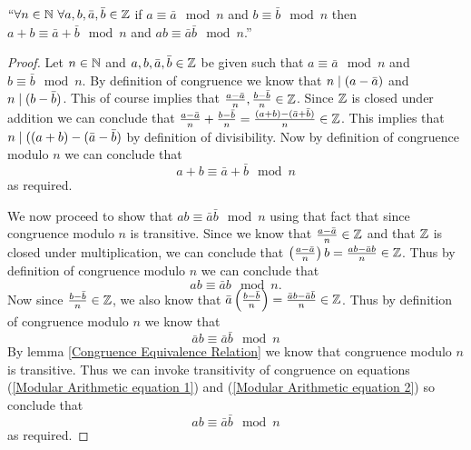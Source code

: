         \begin{lemma}
            $``\forall n \in \mathbb{N} \ \forall a, b, \bar{a}, \bar{b} \in \mathbb{Z}$
            if $a \equiv \bar{a} \mod n$ and $b \equiv \bar{b} \mod n$ then
            $a + b \equiv \bar{a} + \bar{b} \mod n$ and $ab \equiv \bar{a}\bar{b} \mod n$.''
        \end{lemma}
        \begin{proof}
            Let $n \in \mathbb{N}$ and $a, b, \bar{a}, \bar{b} \in \mathbb{Z}$ be given such
            that $a \equiv \bar{a} \mod n$ and $b \equiv \bar{b} \mod n$. By definition 
            of congruence we know that $n \mid (a - \bar{a})$ and $n \mid (b - \bar{b})$.
            This of course implies that $\frac{a - \bar{a}}{n}, \frac{b - \bar{b}}{n} \in \mathbb{Z}$.
            Since $\mathbb{Z}$ is closed under addition we can conclude that
            $\frac{a - \bar{a}}{n} + \frac{b - \bar{b}}{n} = \frac{(a + b) - (\bar{a} + \bar{b})}{n} \in \mathbb{Z}$.
            This implies that $n \mid ((a + b) - (\bar{a} - \bar{b})$ by definition of divisibility.
            Now by definition of congruence modulo $n$ we can conclude that 
            \[
                a + b \equiv \bar{a} + \bar{b} \mod n
            \]
            as required.

            We now proceed to show that $ab \equiv \bar{a}\bar{b} \mod n$ using that fact
            that since congruence modulo $n$ is transitive. Since we know that $\frac{a - \bar{a}}{n} \in \mathbb{Z}$
            and that $\mathbb{Z}$ is closed under multiplication, we can conclude that
            $\left(\frac{a - \bar{a}}{n}\right)b = \frac{ab - \bar{a}b}{n} \in \mathbb{Z}$.
            Thus by definition of congruence modulo $n$ we can conclude that
            \begin{equation}
                ab \equiv \bar{a}b \mod n.
                \label{Modular Arithmetic equation 1}
            \end{equation}
            Now since $\frac{b - \bar{b}}{n} \in \mathbb{Z}$, we also know that
            $\bar{a}\left(\frac{b - \bar{b}}{n}\right) = \frac{\bar{a}b - \bar{a}\bar{b}}{n} \in \mathbb{Z}$.
            Thus by definition of congruence modulo $n$ we know that
            \begin{equation}
                \bar{a}b \equiv \bar{a}\bar{b} \mod n
                \label{Modular Arithmetic equation 2}
            \end{equation}
            By lemma \ref{Congruence Equivalence Relation} we know that congruence modulo $n$
            is transitive. Thus we can invoke transitivity of congruence on equations 
            (\ref{Modular Arithmetic equation 1}) and (\ref{Modular Arithmetic equation 2})
            so conclude that
            \[
                ab \equiv \bar{a}\bar{b} \mod n
            \]
            as required. \QED
        \end{proof}

